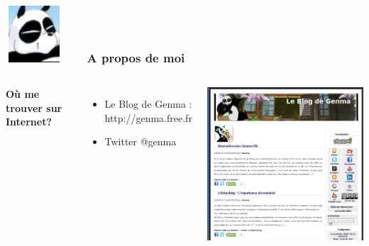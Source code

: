 \documentclass{beamer}
\begin{document}
\begin{frame}
\frametitle{\includegraphics[scale=0.4]{./images/Genma.jpg} \ \ \  A propos de moi  }
\begin{columns}[c] 
\textbf{Où me trouver sur Internet?}
\begin{itemize}
\item Le Blog de Genma : http://genma.free.fr
\item Twitter @genma
\end{itemize}
\includegraphics[scale=0.40] {./images/blog.png} 
\end{columns}
\end{frame}
\end{document}
